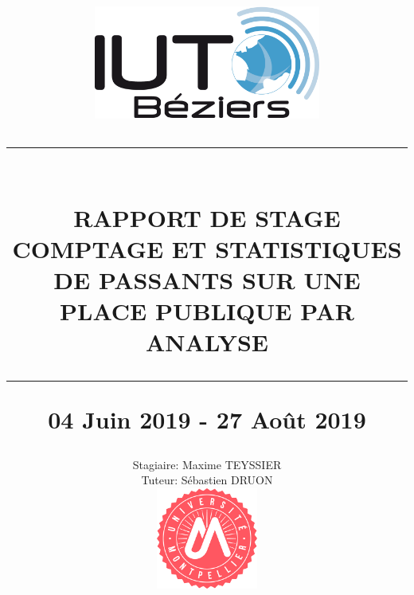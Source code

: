 \documentclass[12pt, french]{report}
\newcommand{\HRule}[1]{\rule{\linewidth}{#1}}
\begin{document}
\pagestyle{fancy}
\fancyhf{}
\setlength\headheight{15pt}


\title{\includegraphics[width=0.56\textwidth]{Images/IUT-Beziers.png}\\
		\normalsize\textsc{}
		\HRule{2pt} \\
        \LARGE \textbf{\uppercase{Rapport de stage\\Comptage et statistiques de passants sur une place publique par analyse}}
		\HRule{2pt} 
		\normalsize 04 Juin 2019 - 27 Août 2019 \vspace*{3\baselineskip}
        }
\author{Stagiaire: Maxime TEYSSIER\\Tuteur: Sébastien DRUON\\ 
        \includegraphics[width=0.25\textwidth]{Images/UM.png}
        \date{}\\
        }
\maketitle
\clearpage
\newpage
\strut									      %
\thispagestyle{empty}							      %
\newpage							              %
\end{document}
